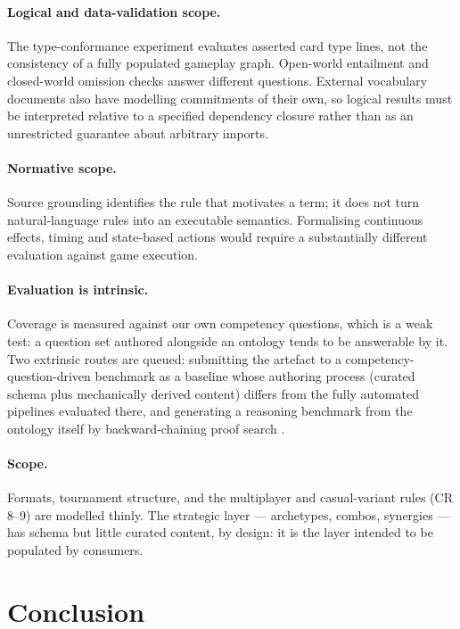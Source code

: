\documentclass[11pt,a4paper]{article}
\begin{document}
\paragraph{Logical and data-validation scope.} The type-conformance experiment evaluates asserted card type lines, not the consistency of a fully populated gameplay graph. Open-world entailment and closed-world omission checks answer different questions. External vocabulary documents also have modelling commitments of their own, so logical results must be interpreted relative to a specified dependency closure rather than as an unrestricted guarantee about arbitrary imports.

\paragraph{Normative scope.} Source grounding identifies the rule that motivates a term; it does not turn natural-language rules into an executable semantics. Formalising continuous effects, timing and state-based actions would require a substantially different evaluation against game execution.

\paragraph{Evaluation is intrinsic.} Coverage is measured against our own competency questions, which is a weak test: a question set authored alongside an ontology tends to be answerable by it. Two extrinsic routes are queued: submitting the artefact to a competency-question-driven benchmark \citep{cq4oe2026} as a baseline whose authoring process (curated schema plus mechanically derived content) differs from the fully automated pipelines evaluated there, and generating a reasoning benchmark from the ontology itself by backward-chaining proof search \citep{vanschependom2026synthology}.

\paragraph{Scope.} Formats, tournament structure, and the multiplayer and casual-variant rules (CR 8--9) are modelled thinly. The strategic layer --- archetypes, combos, synergies --- has schema but little curated content, by design: it is the layer intended to be populated by consumers.

\section{Conclusion}
\end{document}
